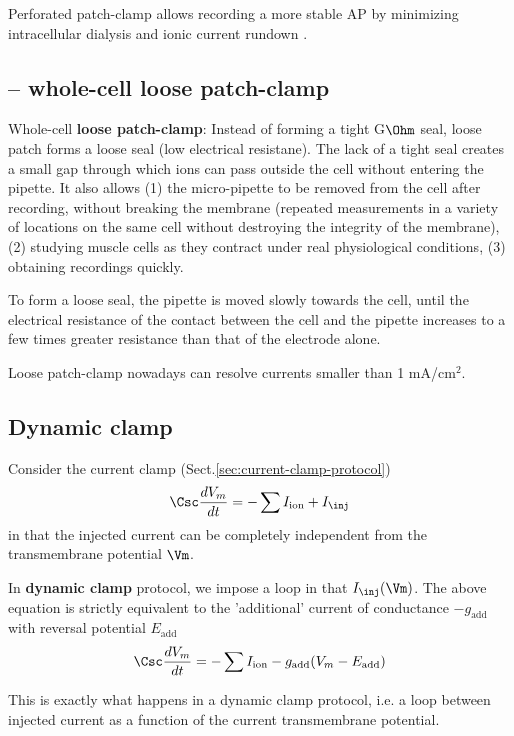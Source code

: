 Perforated patch-clamp allows recording a more stable AP by minimizing
intracellular dialysis and ionic current rundown \citep{ishibashi2012}.

\subsection{-- whole-cell loose patch-clamp}

Whole-cell {\bf loose patch-clamp}: Instead
of forming a tight G$\Ohm$ seal, loose patch forms a loose seal (low electrical
resistane). The lack of a tight seal creates a small gap through which ions can
pass outside the cell without entering the pipette.
It also allows (1) the micro-pipette to be removed from the cell after
recording, without breaking the membrane (repeated measurements in a variety of
locations on the same cell without destroying the integrity of the membrane),
(2) studying muscle cells as they contract under real physiological conditions,
(3) obtaining recordings quickly.

To form a loose seal, the pipette is moved slowly towards the cell, until the
electrical resistance of the contact between the cell and the pipette increases
to a few times greater resistance than that of the electrode alone.

Loose patch-clamp nowadays can resolve currents smaller than 1 mA/cm$^2$.

\subsection{Dynamic clamp}
\label{sec:dynamic-clamp}

Consider the current clamp (Sect.\ref{sec:current-clamp-protocol})
\begin{equation}
\Csc \frac{dV_m}{dt} = -\sum I_\text{ion} + I_\inj
\end{equation}
in that the injected current can be completely independent from the
transmembrane potential $\Vm$.

In {\bf dynamic clamp} protocol, we impose a loop in that $I_\inj(\Vm)$.
The above equation is strictly equivalent to the 'additional' current of
conductance $-g_\text{add}$ with reversal potential $E_\text{add}$
\begin{equation}
\Csc \frac{dV_m}{dt} = -\sum I_\text{ion} - g_\text{add}(V_m - E_\text{add})
\end{equation}

This is exactly what happens in a dynamic clamp protocol, i.e. a loop between
injected current as a function of the current transmembrane potential.

